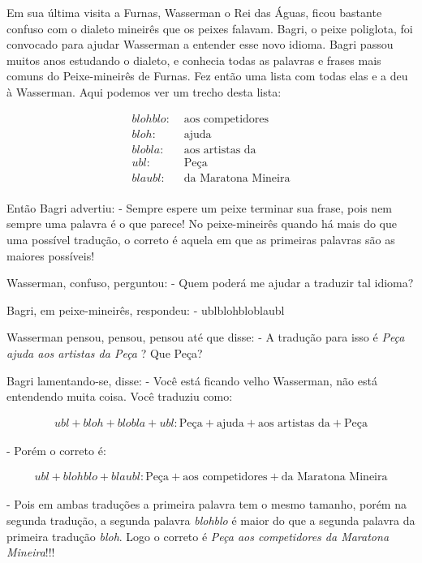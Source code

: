 Em sua última visita a Furnas, Wasserman o Rei das Águas, ficou bastante confuso com o 
dialeto mineirês que os peixes falavam. Bagri, o peixe poliglota, foi convocado para ajudar 
Wasserman a entender esse novo idioma. Bagri passou muitos anos estudando o dialeto, e 
conhecia todas as palavras e frases mais comuns do Peixe-mineirês de Furnas. Fez então uma 
lista com todas elas e a deu à Wasserman. Aqui podemos ver um trecho desta lista:

\begin{align*}
blohblo:& \text{ aos competidores}\\
bloh:& \text{ ajuda}\\
blobla:& \text{ aos artistas da}\\
ubl:& \text{ Peça}\\
blaubl:& \text{ da Maratona Mineira}\\
\end{align*}

Então Bagri advertiu:
- Sempre espere um peixe terminar sua frase, pois nem sempre uma palavra é o que parece!
No peixe-mineirês quando há mais do que uma possível tradução, o correto é aquela em que 
as primeiras palavras são as maiores possíveis!

Wasserman, confuso, perguntou:
- Quem poderá me ajudar a traduzir tal idioma?

Bagri, em peixe-mineirês, respondeu:
- ublblohbloblaubl

Wasserman pensou, pensou, pensou até que disse:
- A tradução para isso é \textit{Peça ajuda aos artistas da Peça} ? Que Peça?

Bagri lamentando-se, disse:
- Você está ficando velho Wasserman, não está entendendo muita coisa. Você traduziu como:

\begin{align*}
ubl + bloh + blobla + ubl: \text{Peça} + \text{ajuda} + \text{aos artistas da} + \text{Peça}
\end{align*}

- Porém o correto é:

\begin{align*}
ubl + blohblo + blaubl: \text{Peça} + \text{aos competidores} + \text{da Maratona Mineira}
\end{align*}

- Pois em ambas traduções a primeira palavra tem o mesmo tamanho, porém na segunda tradução, a segunda
palavra \textit{blohblo} é maior do que a segunda palavra da primeira tradução \textit{bloh}. Logo o
correto é \textit{Peça aos competidores da Maratona Mineira}!!!

